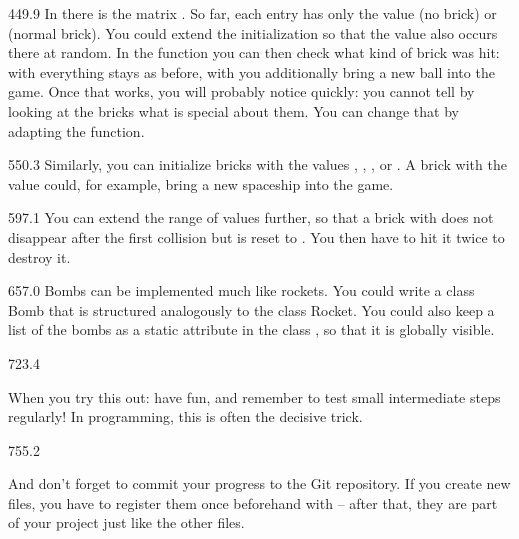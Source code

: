 \documentclass{aslab}
\begin{document}
\begin{region}[pitch=13.45]{449.9}
In  there is the matrix . So far, each entry
has only the value  (no brick) or  (normal brick). You could
extend the initialization so that the value  also occurs there at
random. In the function  you can then check what kind of
brick was hit: with  everything stays as before, with  you
additionally bring a new ball into the game. Once that works, you will
probably notice quickly: you cannot tell by looking at the bricks what is
special about them. You can change that by adapting the 
function.
\end{region}

\begin{region}[pitch=13.55]{550.3}
Similarly, you can initialize bricks with the values , ,
, or . A brick with the value  could, for example,
bring a new spaceship into the game.
\end{region}

\begin{region}[pitch=13.45]{597.1}
You can extend the range of values further, so that a brick with 
does not disappear after the first collision but is reset to . You
then have to hit it twice to destroy it.
\end{region}

\begin{region}[pitch=13.3]{657.0}
Bombs can be implemented much like rockets. You could write a class Bomb
that is structured analogously to the class Rocket. You could also keep a
list of the bombs as a static attribute in the class , so that it
is globally visible.
\end{region}

\begin{region}[pitch=13.1]{723.4}
{\color{aslabblue}
When you try this out: have fun, and remember to test small intermediate
steps regularly! In programming, this is often the decisive trick.
\par}
\end{region}

\begin{region}[pitch=13.35]{755.2}
{\color{aslabblue}
And don't forget to commit your progress to the Git repository. If you
create new files, you have to register them once beforehand with
 -- after that, they are part of your project just
like the other files.
\par}
\end{region}
\end{document}
